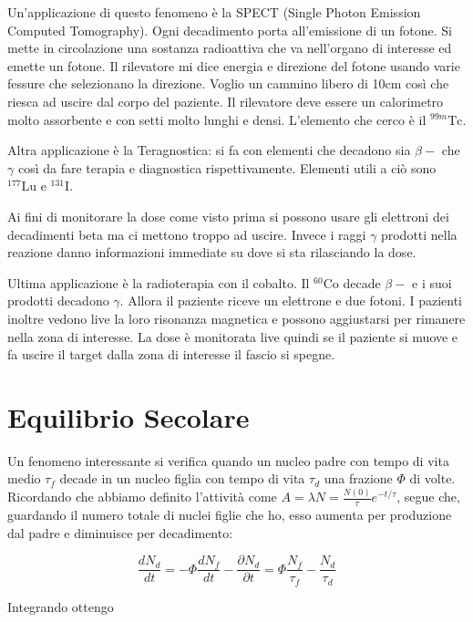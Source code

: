 Un'applicazione di questo fenomeno è la SPECT (Single Photon Emission Computed Tomography). Ogni decadimento porta all'emissione di un fotone. Si mette in circolazione una sostanza radioattiva che va nell'organo di interesse ed emette un fotone. Il rilevatore mi dice energia e direzione del fotone usando varie fessure che selezionano la direzione. Voglio un cammino libero di 10cm così che riesca ad uscire dal corpo del paziente. Il rilevatore deve essere un calorimetro molto assorbente e con setti molto lunghi e densi. L'elemento che cerco è il $^{99m}\text{Tc}$.

Altra applicazione è la Teragnostica: si fa con elementi che decadono sia $\beta-$ che $\gamma$ così da fare terapia e diagnostica rispettivamente. Elementi utili a ciò sono $^{177}\text{Lu}$ e $^{131}\text{I}$.

Ai fini di monitorare la dose come visto prima si possono usare gli elettroni dei decadimenti beta ma ci mettono troppo ad uscire. Invece i raggi $\gamma$ prodotti nella reazione danno informazioni immediate su dove si sta rilasciando la dose.

Ultima applicazione è la radioterapia con il cobalto. Il $^{60}\text{Co}$ decade $\beta-$ e i suoi prodotti decadono $\gamma$. Allora il paziente riceve un elettrone e due fotoni. I pazienti inoltre vedono live la loro risonanza magnetica e possono aggiustarsi per rimanere nella zona di interesse. La dose è monitorata live quindi se il paziente si muove e fa uscire il target dalla zona di interesse il fascio si spegne.

\section{Equilibrio Secolare}

Un fenomeno interessante si verifica quando un nucleo padre con tempo di vita medio $\tau_f$ decade in un nucleo figlia con tempo di vita $\tau_d$ una frazione $\Phi$ di volte. Ricordando che abbiamo definito l'attività come $A=\lambda N=\frac{N(0)}{\tau}e^{-t/\tau}$, segue che, guardando il numero totale di nuclei figlie che ho, esso aumenta per produzione dal padre e diminuisce per decadimento:

\begin{equation}
\frac{dN_d}{dt}=-\Phi \frac{dN_f}{dt} - \frac{\partial N_d}{\partial t} = \Phi \frac{N_f}{\tau_f} - \frac{N_d}{\tau_d}
\end{equation}

Integrando ottengo


